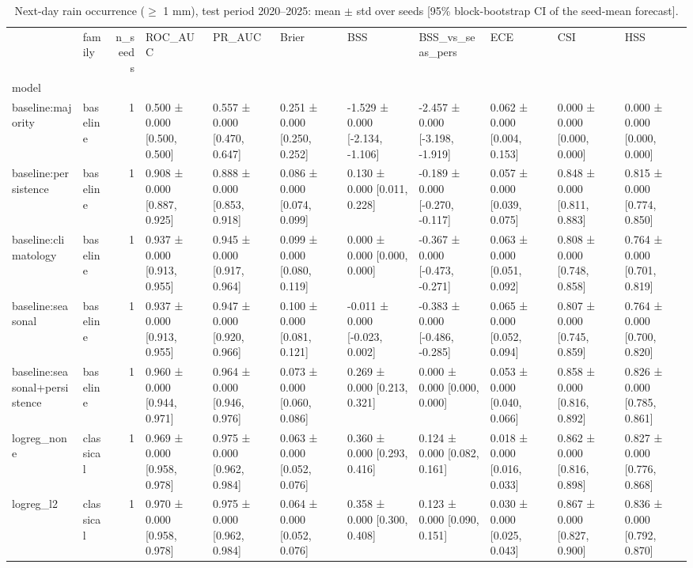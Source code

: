 \begin{table}
\caption{Next-day rain occurrence ($\geq$ 1 mm), test period 2020--2025: mean $\pm$ std over seeds [95\% block-bootstrap CI of the seed-mean forecast].}
\label{tab:test_cls}
\begin{tabular}{llrllllllll}
\toprule
 & family & n\_seeds & ROC\_AUC & PR\_AUC & Brier & BSS & BSS\_vs\_seas\_pers & ECE & CSI & HSS \\
model &  &  &  &  &  &  &  &  &  &  \\
\midrule
baseline:majority & baseline & 1 & 0.500 ± 0.000 [0.500, 0.500] & 0.557 ± 0.000 [0.470, 0.647] & 0.251 ± 0.000 [0.250, 0.252] & -1.529 ± 0.000 [-2.134, -1.106] & -2.457 ± 0.000 [-3.198, -1.919] & 0.062 ± 0.000 [0.004, 0.153] & 0.000 ± 0.000 [0.000, 0.000] & 0.000 ± 0.000 [0.000, 0.000] \\
baseline:persistence & baseline & 1 & 0.908 ± 0.000 [0.887, 0.925] & 0.888 ± 0.000 [0.853, 0.918] & 0.086 ± 0.000 [0.074, 0.099] & 0.130 ± 0.000 [0.011, 0.228] & -0.189 ± 0.000 [-0.270, -0.117] & 0.057 ± 0.000 [0.039, 0.075] & 0.848 ± 0.000 [0.811, 0.883] & 0.815 ± 0.000 [0.774, 0.850] \\
baseline:climatology & baseline & 1 & 0.937 ± 0.000 [0.913, 0.955] & 0.945 ± 0.000 [0.917, 0.964] & 0.099 ± 0.000 [0.080, 0.119] & 0.000 ± 0.000 [0.000, 0.000] & -0.367 ± 0.000 [-0.473, -0.271] & 0.063 ± 0.000 [0.051, 0.092] & 0.808 ± 0.000 [0.748, 0.858] & 0.764 ± 0.000 [0.701, 0.819] \\
baseline:seasonal & baseline & 1 & 0.937 ± 0.000 [0.913, 0.955] & 0.947 ± 0.000 [0.920, 0.966] & 0.100 ± 0.000 [0.081, 0.121] & -0.011 ± 0.000 [-0.023, 0.002] & -0.383 ± 0.000 [-0.486, -0.285] & 0.065 ± 0.000 [0.052, 0.094] & 0.807 ± 0.000 [0.745, 0.859] & 0.764 ± 0.000 [0.700, 0.820] \\
baseline:seasonal+persistence & baseline & 1 & 0.960 ± 0.000 [0.944, 0.971] & 0.964 ± 0.000 [0.946, 0.976] & 0.073 ± 0.000 [0.060, 0.086] & 0.269 ± 0.000 [0.213, 0.321] & 0.000 ± 0.000 [0.000, 0.000] & 0.053 ± 0.000 [0.040, 0.066] & 0.858 ± 0.000 [0.816, 0.892] & 0.826 ± 0.000 [0.785, 0.861] \\
logreg\_none & classical & 1 & 0.969 ± 0.000 [0.958, 0.978] & 0.975 ± 0.000 [0.962, 0.984] & 0.063 ± 0.000 [0.052, 0.076] & 0.360 ± 0.000 [0.293, 0.416] & 0.124 ± 0.000 [0.082, 0.161] & 0.018 ± 0.000 [0.016, 0.033] & 0.862 ± 0.000 [0.816, 0.898] & 0.827 ± 0.000 [0.776, 0.868] \\
logreg\_l2 & classical & 1 & 0.970 ± 0.000 [0.958, 0.978] & 0.975 ± 0.000 [0.962, 0.984] & 0.064 ± 0.000 [0.052, 0.076] & 0.358 ± 0.000 [0.300, 0.408] & 0.123 ± 0.000 [0.090, 0.151] & 0.030 ± 0.000 [0.025, 0.043] & 0.867 ± 0.000 [0.827, 0.900] & 0.836 ± 0.000 [0.792, 0.870] \\

\end{tabular}
\end{table}
